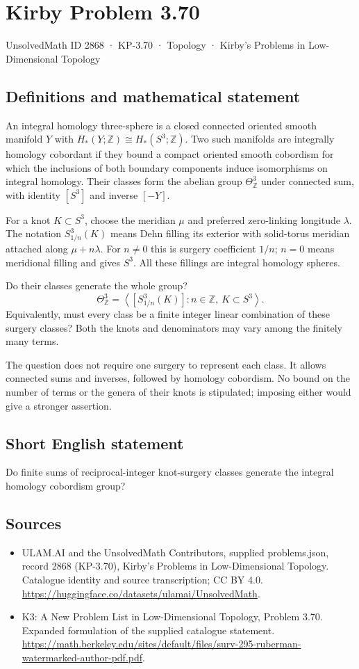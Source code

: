 \documentclass[11pt,a4paper]{article}
\begin{document}
\section*{Kirby Problem 3.70}\label{2868}
{\small UnsolvedMath ID 2868 · KP-3.70 · Topology · Kirby's Problems in Low-Dimensional Topology}
\subsection{Definitions and mathematical statement}
An integral homology three-sphere is a closed connected oriented smooth manifold $Y$ with $H_*(Y;\mathbb Z)\cong H_*(S^3;\mathbb Z)$. Two such manifolds are integrally homology cobordant if they bound a compact oriented smooth cobordism for which the inclusions of both boundary components induce isomorphisms on integral homology. Their classes form the abelian group $\Theta^3_{\mathbb Z}$ under connected sum, with identity $[S^3]$ and inverse $[-Y]$.

For a knot $K\subset S^3$, choose the meridian $\mu$ and preferred zero-linking longitude $\lambda$. The notation $S^3_{1/n}(K)$ means Dehn filling its exterior with solid-torus meridian attached along $\mu+n\lambda$. For $n\ne0$ this is surgery coefficient $1/n$; $n=0$ means meridional filling and gives $S^3$. All these fillings are integral homology spheres.

Do their classes generate the whole group?
\[
\Theta^3_{\mathbb Z}
=\left\langle [S^3_{1/n}(K)]:n\in\mathbb Z,\ K\subset S^3\right\rangle.
\]
Equivalently, must every class be a finite integer linear combination of these surgery classes? Both the knots and denominators may vary among the finitely many terms.

The question does not require one surgery to represent each class. It allows connected sums and inverses, followed by homology cobordism. No bound on the number of terms or the genera of their knots is stipulated; imposing either would give a stronger assertion.
\subsection{Short English statement}
Do finite sums of reciprocal-integer knot-surgery classes generate the integral homology cobordism group?
\subsection{Sources}
\begin{itemize}
\item[S1] ULAM.AI and the UnsolvedMath Contributors, supplied problems.json, record 2868 (KP-3.70), Kirby's Problems in Low-Dimensional Topology. Catalogue identity and source transcription; CC BY 4.0.
\url{https://huggingface.co/datasets/ulamai/UnsolvedMath}.
\item[S2] K3: A New Problem List in Low-Dimensional Topology, Problem 3.70. Expanded formulation of the supplied catalogue statement.
\url{https://math.berkeley.edu/sites/default/files/surv-295-ruberman-watermarked-author-pdf.pdf}.
\end{itemize}
\end{document}
